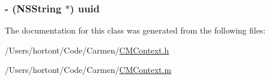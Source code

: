 \hypertarget{interface_c_m_context_35d03d537cce465cc6ec2e40279e9355}{
\subsubsection[uuid]{\setlength{\rightskip}{0pt plus 5cm}- ({\bf NSString} $\ast$) {\bf uuid}}}
\label{interface_c_m_context_35d03d537cce465cc6ec2e40279e9355}




The documentation for this class was generated from the following files:\begin{CompactItemize}
\item 
/Users/hortont/Code/Carmen/\hyperlink{_c_m_context_8h}{CMContext.h}\item 
/Users/hortont/Code/Carmen/\hyperlink{_c_m_context_8m}{CMContext.m}\end{CompactItemize}
